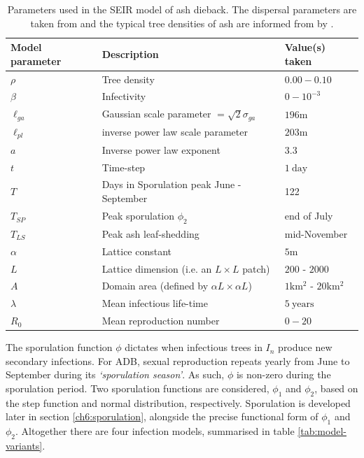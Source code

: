 \begin{table}[h]
\centering
\begin{tabular}{l l l}
\hline
\textbf{Model parameter} & \textbf{Description} & \textbf{Value(s) taken}\\
\hline
$\rho$  & Tree density & $0.00 - 0.10$ \\ 
$\beta$ & Infectivity & $0 - 10^{-3}$ \\
$\ell_{ga}$ & Gaussian scale parameter $=\sqrt{2}\sigma_{ga}$ & $196\mathrm{m}$ \\
$\ell_{pl}$ & inverse power law scale parameter & $203\mathrm{m}$ \\
$a$ & Inverse power law exponent & $3.3$ \\
$t$ & Time-step & $1\ \mathrm{day}$\\
$T$ & Days in Sporulation peak June - September & 122  \\
$T_{SP}$ & Peak sporulation $\phi_2$ & end of July \\
$T_{LS}$ & Peak ash leaf-shedding & mid-November \\
$\alpha$ & Lattice constant & $5\mathrm{m}$ \\
$L$ & Lattice dimension (i.e. an $L\times L$ patch)  & $200$ - $2000$ \\
$A$ & Domain area (defined by $\alpha L\times \alpha L$) & $1\mathrm{km^2}$ - $20\mathrm{km^2}$ \\
$\lambda$ & Mean infectious life-time & $5\ \mathrm{years}$ \\
$R_0$ & Mean reproduction number & $0-20$ \\
\hline
\end{tabular}
\caption{Parameters used in the SEIR model of ash dieback. The dispersal parameters are taken from \cite{grosdidier2018tracking} and the typical tree densities of ash are informed from by \cite{hill.data}.}
\label{tab:SEIR-model}
\end{table}

The sporulation function $\phi$ dictates when infectious trees in $I_n$ produce new secondary infections. 
For ADB, sexual reproduction repeats yearly from June to September during its \textit{`sporulation season'}.
As such, $\phi$ is non-zero during the sporulation period.
Two sporulation functions are considered, $\phi_1$ and $\phi_2$, based on the step function and normal distribution, respectively.
Sporulation is developed later in section \ref{ch6:sporulation}, alongside the precise functional form of $\phi_1$ and $\phi_2$.
Altogether there are four infection models, summarised in table \ref{tab:model-variants}.

